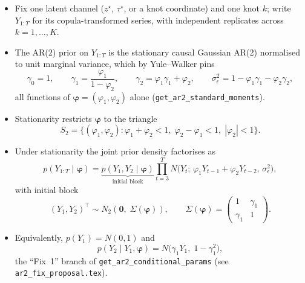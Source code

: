 \documentclass[11pt]{article}
\newcommand{\bZero}{\boldsymbol{0}}
\newcommand{\bphi}{\boldsymbol{\varphi}}
\theoremstyle{plain}
\theoremstyle{definition}
\theoremstyle{remark}
\begin{document}
\begin{itemize}
  \item Fix one latent channel ($z^\star$, $\tau^\star$, or a knot coordinate)
        and one knot $k$; write $Y_{1:T}$ for its copula-transformed series,
        with independent replicates across $k = 1, \dots, K$.
  \item The AR(2) prior on $Y_{1:T}$ is the stationary causal Gaussian AR(2)
        normalised to unit marginal variance, which by Yule--Walker pins
        \begin{equation}\label{eq:moments}
          \gamma_0 = 1, \qquad
          \gamma_1 = \frac{\varphi_1}{1 - \varphi_2}, \qquad
          \gamma_2 = \varphi_1 \gamma_1 + \varphi_2, \qquad
          \sigma_\epsilon^2 = 1 - \varphi_1 \gamma_1 - \varphi_2 \gamma_2,
        \end{equation}
        all functions of $\bphi = (\varphi_1, \varphi_2)$ alone
        (\texttt{get\_ar2\_standard\_moments}).
  \item Stationarity restricts $\bphi$ to the triangle
        \begin{equation}\label{eq:triangle}
          S_2 = \bigl\{ (\varphi_1, \varphi_2) :
            \varphi_1 + \varphi_2 < 1,\;
            \varphi_2 - \varphi_1 < 1,\;
            |\varphi_2| < 1 \bigr\}.
        \end{equation}
  \item Under stationarity the joint prior density factorises as
        \begin{equation}\label{eq:factor}
          p(Y_{1:T} \mid \bphi)
          = \underbrace{p(Y_1, Y_2 \mid \bphi)}_{\text{initial block}}
            \prod_{t=3}^{T}
            N\!\bigl( Y_t ;\, \varphi_1 Y_{t-1} + \varphi_2 Y_{t-2},\,
                      \sigma_\epsilon^2 \bigr),
        \end{equation}
        with initial block
        \begin{equation}\label{eq:init}
          (Y_1, Y_2)^\top \sim
          N_2\!\left( \bZero,\; \Sigma(\bphi) \right),
          \qquad
          \Sigma(\bphi) =
          \begin{pmatrix} 1 & \gamma_1 \\ \gamma_1 & 1 \end{pmatrix}.
        \end{equation}
  \item Equivalently, $p(Y_1) = N(0, 1)$ and
        \begin{equation}\label{eq:p2}
          p(Y_2 \mid Y_1, \bphi)
          = N\!\bigl( \gamma_1 Y_1,\; 1 - \gamma_1^2 \bigr),
        \end{equation}
        the ``Fix~1'' branch of \texttt{get\_ar2\_conditional\_params}
        (see \texttt{ar2\_fix\_proposal.tex}).
\end{itemize}
\end{document}
